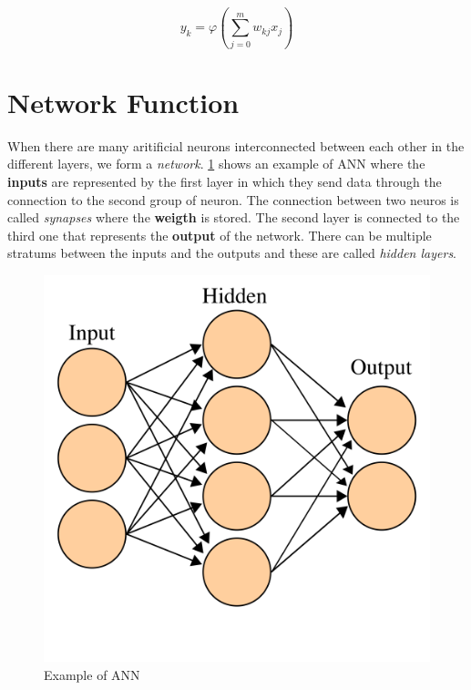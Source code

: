 \begin{equation*}
    y_k = \varphi \left ( \sum_{j=0}^{m} w_{kj} x_j \right )
\end{equation*}

\section{Network Function}
When there are many aritificial neurons interconnected between each other in the different layers, we form a \textit{network}. \ref{fig:ann} shows an example of ANN where the \textbf{inputs} are represented by the first layer in which they send data through the connection to the second group of neuron. The connection between two neuros is called \textit{synapses} where the \textbf{weigth} is stored. The second layer is connected to the third one that represents the \textbf{output} of the network. There can be multiple stratums between the inputs and the outputs and these are called \textit{hidden layers}. \\

\begin{figure}[!ht]
    \centering
    \includegraphics[scale=0.15]{Figures/ann.png}
    \caption{Example of ANN \cite{ann_wiki}}
    \label{fig:ann}
\end{figure}

